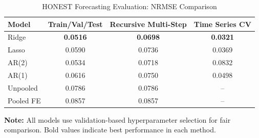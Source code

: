 \begin{table}[htbp]
\centering
\caption{HONEST Forecasting Evaluation: NRMSE Comparison}
\label{tab:honest_forecasting_simple}
\begin{tabular}{@{} l ccc @{}}
\toprule
\textbf{Model} & \textbf{Train/Val/Test} & \textbf{Recursive Multi-Step} & \textbf{Time Series CV} \\
\midrule
Ridge & \textbf{0.0516} & \textbf{0.0698} & \textbf{0.0321} \\
Lasso & 0.0590 & 0.0736 & 0.0369 \\
AR(2) & 0.0534 & 0.0718 & 0.0832 \\
AR(1) & 0.0616 & 0.0750 & 0.0498 \\
Unpooled & 0.0786 & 0.0786 & -- \\
Pooled FE & 0.0857 & 0.0857 & -- \\
\bottomrule
\end{tabular}
\end{table}

\vspace{0.5cm}
\noindent \textbf{Note:} All models use validation-based hyperparameter selection for fair comparison. Bold values indicate best performance in each method.